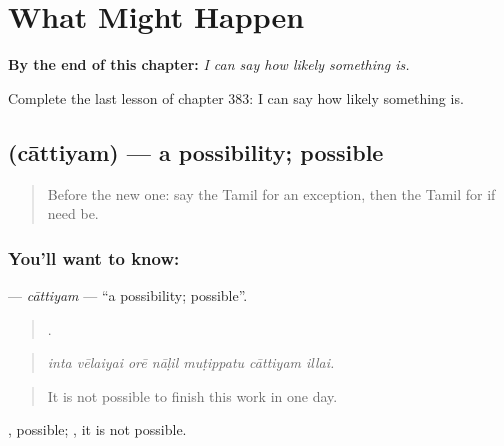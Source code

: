 
\chapter{What Might Happen}
\label{ch:ta-what-might-happen}

\begin{chapteropening}
\textbf{By the end of this chapter:} \emph{I can say how likely something is.}

Complete the last lesson of chapter 383: I can say how likely something is.
\end{chapteropening}

\section[\texorpdfstring{\ta{சாத்தியம்} (cāttiyam)}{சாத்தியம் (cāttiyam)}]{ (cāttiyam) — a possibility; possible}

\label{lesson:TA-C383-cattiyam}



\begin{quote}
Before the new one: say the Tamil for an exception, then the Tamil for if need be.
\end{quote}

\subsection*{You'll want to know: }
\textbf{} — \emph{cāttiyam} — \textquotedblleft{}a possibility; possible\textquotedblright{}.

\begin{quote}
      .
\end{quote}

\begin{quote}
\emph{inta vēlaiyai orē nāḷil muṭippatu cāttiyam illai.}
\end{quote}

\begin{quote}
It is not possible to finish this work in one day.
\end{quote}

, possible; , it is not possible.


